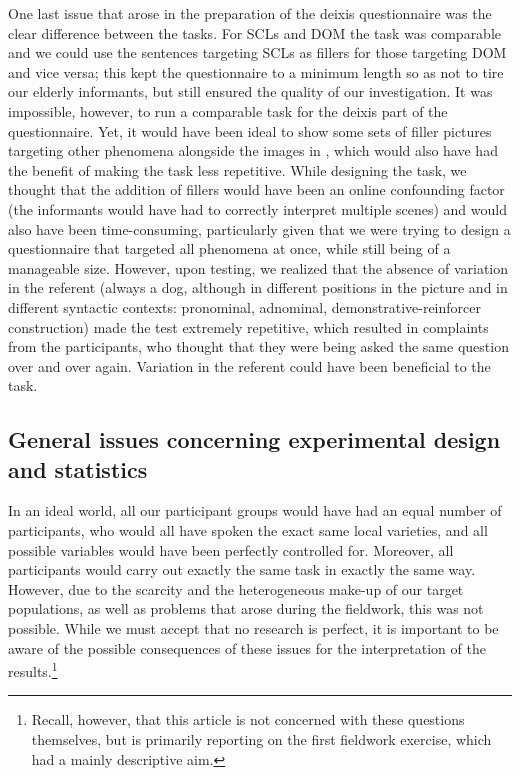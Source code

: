 \documentclass[output=paper,hidelinks]{langscibook}
\begin{document}
One last issue that arose in the preparation of the deixis questionnaire was the clear difference between the tasks. For SCLs and DOM the task was comparable and we could use the sentences targeting SCLs as fillers for those targeting DOM and vice versa; this kept the questionnaire to a minimum length so as not to tire our elderly informants, but still ensured the quality of our investigation. It was impossible, however, to run a comparable task for the deixis part of the questionnaire. Yet, it would have been ideal to show some sets of filler pictures targeting other phenomena alongside the images in , which would also have had the benefit of making the task less repetitive. While designing the task, we thought that the addition of fillers would have been an online confounding factor (the informants would have had to correctly interpret multiple scenes) and would also have been time-consuming, particularly given that we were trying to design a questionnaire that targeted all phenomena at once, while still being of a manageable size. However, upon testing, we realized that the absence of variation in the referent (always a dog, although in different positions in the picture and in different syntactic contexts: pronominal, adnominal, demonstrative-reinforcer construction) made the test extremely repetitive, which resulted in complaints from the participants, who thought that they were being asked the same question over and over again. Variation in the referent could have been beneficial to the task. 

\subsection{General issues concerning experimental design and statistics}\label{sec:andriani:3.3}

In an ideal world, all our participant groups would have had an equal number of participants, who would all have spoken the exact same local varieties, and all possible variables would have been perfectly controlled for. Moreover, all participants would carry out exactly the same task in exactly the same way. However, due to the scarcity and the heterogeneous make-up of our target populations, as well as problems that arose during the fieldwork, this was not possible. While we must accept that no research is perfect, it is important to be aware of the possible consequences of these issues for the interpretation of the results.\footnote{Recall, however, that this article is not concerned with these questions themselves, but is primarily reporting on the first fieldwork exercise, which had a mainly descriptive aim.}
\end{document}
